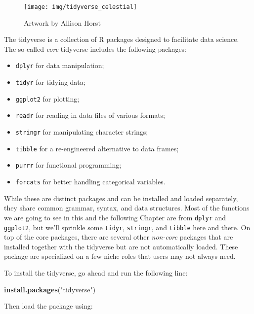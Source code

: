 \documentclass[
]{book}
\newenvironment{Shaded}{\begin{snugshade}}{\end{snugshade}}
\newcommand{\FunctionTok}[1]{\textcolor[rgb]{0.13,0.29,0.53}{\textbf{#1}}}
\newcommand{\NormalTok}[1]{#1}
\newcommand{\StringTok}[1]{\textcolor[rgb]{0.31,0.60,0.02}{#1}}
\providecommand{\tightlist}{%
  \setlength{\itemsep}{0pt}\setlength{\parskip}{0pt}}
\begin{document}
\begin{figure}

{\centering \texttt{[image: img/tidyverse\_celestial]} 

}

\caption{Artwork by Allison Horst}\label{fig:tidy1}
\end{figure}

The tidyverse is a collection of R packages designed to facilitate data science.
The so-called \emph{core} tidyverse includes the following packages:

\begin{itemize}
\tightlist
\item
  \texttt{dplyr} for data manipulation;
\item
  \texttt{tidyr} for tidying data;
\item
  \texttt{ggplot2} for plotting;
\item
  \texttt{readr} for reading in data files of various formats;
\item
  \texttt{stringr} for manipulating character strings;
\item
  \texttt{tibble} for a re-engineered alternative to data frames;
\item
  \texttt{purrr} for functional programming;
\item
  \texttt{forcats} for better handling categorical variables.
\end{itemize}

While these are distinct packages and can be installed and loaded separately,
they share common grammar, syntax, and data structures. Most of the functions we
are going to see in this and the following Chapter are from \texttt{dplyr} and
\texttt{ggplot2}, but we'll sprinkle some \texttt{tidyr}, \texttt{stringr}, and \texttt{tibble} here and
there. On top of the core packages, there are several other \emph{non-core}
packages that are installed together with the tidyverse but are not
automatically loaded. These package are specialized on a few niche roles that
users may not always need.

To install the tidyverse, go ahead and run the following line:

\begin{Shaded}
\begin{Highlighting}[]
\FunctionTok{install.packages}\NormalTok{(}\StringTok{"tidyverse"}\NormalTok{)}
\end{Highlighting}
\end{Shaded}

Then load the package using:
\end{document}
